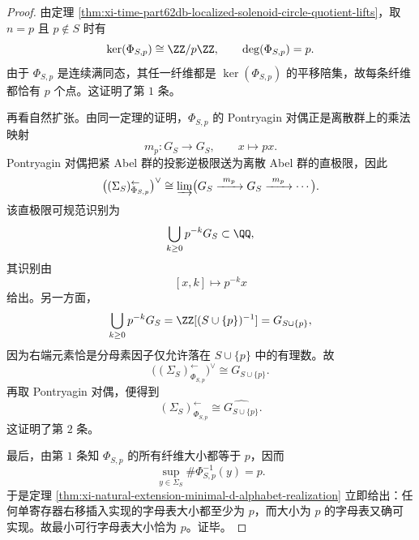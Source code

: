 \begin{proof}
由定理 \ref{thm:xi-time-part62db-localized-solenoid-circle-quotient-lifts}，取 \(n=p\) 且 \(p\notin S\) 时有
\[
\ker(\Phi_{S,p})\cong \ZZ/p\ZZ,
\qquad
\deg(\Phi_{S,p})=p.
\]
由于 \(\Phi_{S,p}\) 是连续满同态，其任一纤维都是 \(\ker(\Phi_{S,p})\) 的平移陪集，故每条纤维都恰有 \(p\) 个点。这证明了第 \(1\) 条。

再看自然扩张。由同一定理的证明，\(\Phi_{S,p}\) 的 Pontryagin 对偶正是离散群上的乘法映射
\[
m_p:G_S\to G_S,
\qquad
x\mapsto px.
\]
Pontryagin 对偶把紧 Abel 群的投影逆极限送为离散 Abel 群的直极限，因此
\[
\bigl((\Sigma_S)^{\leftarrow}_{\Phi_{S,p}}\bigr)^\vee
\cong
\varinjlim\bigl(
G_S\xrightarrow{\ m_p\ }G_S\xrightarrow{\ m_p\ }\cdots
\bigr).
\]
该直极限可规范识别为
\[
\bigcup_{k\ge 0}p^{-k}G_S\subset \QQ,
\]
其识别由
\[
[x,k]\longmapsto p^{-k}x
\]
给出。另一方面，
\[
\bigcup_{k\ge 0}p^{-k}G_S
=
\ZZ[(S\cup\{p\})^{-1}]
=
G_{S\cup\{p\}},
\]
因为右端元素恰是分母素因子仅允许落在 \(S\cup\{p\}\) 中的有理数。故
\[
\bigl((\Sigma_S)^{\leftarrow}_{\Phi_{S,p}}\bigr)^\vee
\cong
G_{S\cup\{p\}}.
\]
再取 Pontryagin 对偶，便得到
\[
(\Sigma_S)^{\leftarrow}_{\Phi_{S,p}}
\cong
\widehat{G_{S\cup\{p\}}}.
\]
这证明了第 \(2\) 条。

最后，由第 \(1\) 条知 \(\Phi_{S,p}\) 的所有纤维大小都等于 \(p\)，因而
\[
\sup_{y\in \Sigma_S}\#\Phi_{S,p}^{-1}(y)=p.
\]
于是定理 \ref{thm:xi-natural-extension-minimal-d-alphabet-realization} 立即给出：任何单寄存器右移插入实现的字母表大小都至少为 \(p\)，而大小为 \(p\) 的字母表又确可实现。故最小可行字母表大小恰为 \(p\)。证毕。
\end{proof}

